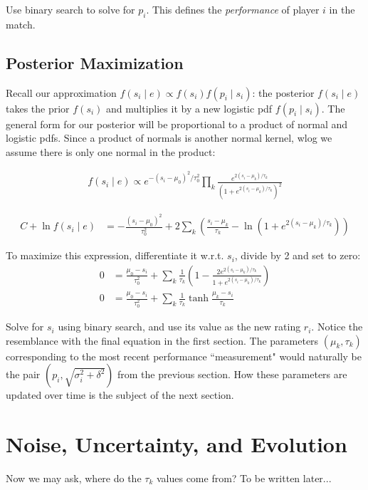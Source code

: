 \documentclass{article}
\begin{document}
Use binary search to solve for $p_i$. This defines the \emph{performance} of player $i$ in the match.

\subsection{Posterior Maximization}

Recall our approximation $f(s_i\mid e) \propto f(s_i)f(p_i\mid s_i)$: the posterior $f(s_i \mid e)$ takes the prior $f(s_i)$ and multiplies it by a new logistic pdf $f(p_i\mid s_i)$. The general form for our posterior will be proportional to a product of normal and logistic pdfs. Since a product of normals is another normal kernel, wlog we assume there is only one normal in the product:

\begin{align}
f(s_i\mid e) \propto e^{-(s_i-\mu_0)^2/\tau_0^2} \prod_k \frac { e^{2(s_i-\mu_k)/\tau_k} } { \left(1 + e^{2(s_i-\mu_k)/\tau_k} \right)^2 }
\end{align}

\begin{align}
C + \ln f(s_i \mid e) &= -\frac{(s_i-\mu_0)^2}{\tau_0^2} + 2\sum_k \left( \frac{s_i-\mu_k}{\tau_k} - \ln(1 + e^{2(s_i-\mu_k)/\tau_k}) \right)
\end{align}

To maximize this expression, differentiate it w.r.t. $s_i$, divide by 2 and set to zero:
\begin{align}
0 &= \frac{\mu_0-s_i}{\tau_0^2} + \sum_k \frac{1}{\tau_k}\left( 1 - \frac {2e^{2(s_i-\mu_k)/\tau_k}} {1 + e^{2(s_i-\mu_k)/\tau_k}} \right)
\\0 &=  \frac{\mu_0-s_i}{\tau_0^2} + \sum_k \frac{1}{\tau_k} \tanh \frac {\mu_k-s_i} {\tau_k}
\end{align}

Solve for $s_i$ using binary search, and use its value as the new rating $r_i$. Notice the resemblance with the final equation in the first section. The parameters $(\mu_k,\tau_k)$ corresponding to the most recent performance ``measurement" would naturally be the pair $(p_i, \sqrt{\sigma_i^2+\delta^2})$ from the previous section. How these parameters are updated over time is the subject of the next section.

\section{Noise, Uncertainty, and Evolution}

Now we may ask, where do the $\tau_k$ values come from? To be written later...
\end{document}

